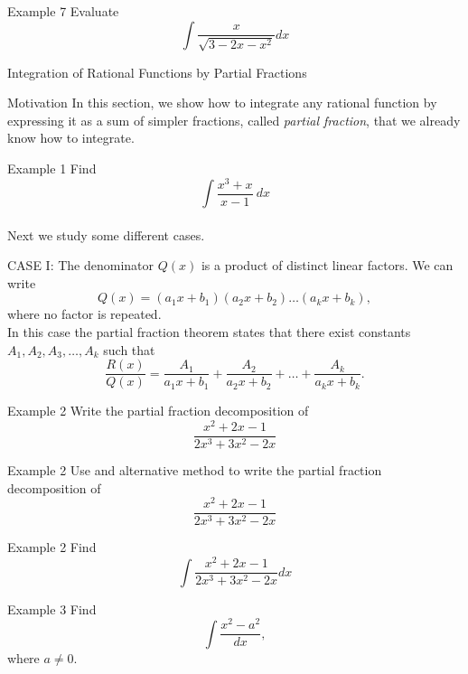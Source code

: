 \documentclass{beamer}
\begin{document}
\begin{frame}{Example 7}
    Evaluate \[\int \dfrac{x}{\sqrt{3-2x-x^2}}dx\]
\end{frame}

\begin{frame}{}
\begin{center}
    \Huge{Integration of Rational Functions by Partial Fractions}
\end{center}
\end{frame}

\begin{frame}{Motivation}
In this section, we show how to integrate any rational function by expressing it as a sum of simpler fractions, called \textit{partial fraction}, that we already know how to integrate. 
\end{frame}

    \begin{frame}{Example 1}
    Find \[\int \dfrac{x^3+x}{x-1}~dx\]\\ \pause
    \vspace{0.5in}
    Next we study some different cases. 
    \end{frame}

\begin{frame}{CASE I: The denominator \(Q(x)\) is a product of distinct linear factors.}    
We can write \[Q(x)=(a_1 x+b_1)(a_2x+b_2)\dots (a_k x +b_k),\] where no factor is repeated. \\ \pause
\vspace{0.2in}
In this case the partial fraction theorem states that there exist constants \(A_1,A_2,A_3, \dots , A_k\) such that \[\dfrac{R(x)}{Q(x)}= \dfrac{A_1}{a_1x+b_1}+ \dfrac{A_2}{a_2x+b_2}+ \dots + \dfrac{A_k}{a_k x +b_k}.\]
\end{frame}

\begin{frame}{Example 2}
Write the partial fraction decomposition of \[\dfrac{x^2 +2x -1}{2x^3+3x^2-2x}\]
\end{frame}

\begin{frame}{Example 2}
    Use and alternative method to write the partial fraction decomposition of \[\dfrac{x^2 +2x -1}{2x^3+3x^2-2x}\]
    \end{frame}

\begin{frame}{Example 2}
Find \[\int \dfrac{x^2 +2x -1}{2x^3+3x^2-2x}dx\]
\end{frame}

\begin{frame}{Example 3}
Find \[\int \dfrac{x^2-a^2}{dx},\] where \(a \ne 0\).
\end{frame}
\end{document}
